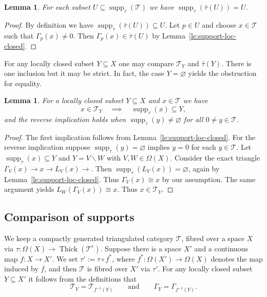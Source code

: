 \documentclass{amsart}[a4]
\newtheorem{lemma}[theorem]{Lemma}
\theoremstyle{definition}
\theoremstyle{remark}
\numberwithin{equation}{section}
\newcommand{\supp}{\operatorname{supp}}
\newcommand{\Thick}{\operatorname{Thick}}
\newcommand{\cat}{\mathcal}
\let\Gamma\varGamma
\let\Omega\varOmega
\begin{document}
\begin{lemma}\label{le:supp-surjective}
  For each subset $U\subseteq \supp_\tau(\cat T)$ we have
  $\supp_\tau(\bar\tau(U))=U$.
\end{lemma}
\begin{proof}
  By definition we have $\supp_\tau(\bar\tau(U))\subseteq
  U$. Let $p\in U$ and choose $x\in\cat T$ such that $\Gamma_p(x)\neq
    0$. Then $\Gamma_p(x)\in\bar\tau(U)$ by Lemma~\ref{le:support-loc-closed}.
\end{proof}  

For any locally closed subset $Y\subseteq X$ one may compare $\cat T_Y$ and
$\bar\tau(Y)$. There is one inclusion but it may be strict. In fact, the case
$Y=\varnothing$ yields the obstruction for equality.

\begin{lemma}\label{le:supp-detection}
  For a locally closed subset $Y\subseteq X$ and $x\in\cat T$ we have
  \[x\in\cat T_Y\quad\implies\quad \supp_\tau(x)\subseteq Y,\]
and the reverse implication holds when $\supp_\tau(y)\neq\varnothing$ for
all $0\neq y\in\cat T$.
\end{lemma}
\begin{proof}
 The first implication follows from
  Lemma~\ref{le:support-loc-closed}. For the reverse implication suppose
  $\supp_\tau(y)=\varnothing$ implies $y=0$ for each $y\in\cat T$.
  Let $\supp_\tau(x)\subseteq Y$ and $Y=V\smallsetminus W$ with
  $V,W\in\Omega(X)$. Consider the exact triangle
  $\Gamma_V(x)\to x\to L_V(x)\to$. Then
  $\supp_\tau(L_V(x))=\varnothing$, again by
  Lemma~\ref{le:support-loc-closed}. Thus $\Gamma_V(x)\cong x$ by our
  assumption. The same argument yields $L_W(\Gamma_V(x))\cong x$. Thus
  $x\in\cat T_Y$.
\end{proof}

\subsection*{Comparison of supports}

We keep a compactly generated triangulated category $\cat T$, fibred
over a space $X$ via
$\tau\colon\Omega(X)\to\Thick(\cat T^{\mathrm c})$. Suppose there is a
space $X'$ and a continuous map $f\colon X\to X'$. We set
$\tau':=\tau\circ f^*$, where $f^*\colon\Omega(X')\to\Omega(X)$ denotes
the map induced by $f$, and then $\cat T$ is fibred over $X'$ via
$\tau'$. For any locally closed subset $Y\subseteq X'$ it follows from the definitions that
\[\cat T_Y=\cat T_{f^{-1}(Y)}\qquad\text{and}\qquad\Gamma_Y=\Gamma_{f^{-1}(Y)}.\]
\end{document}
